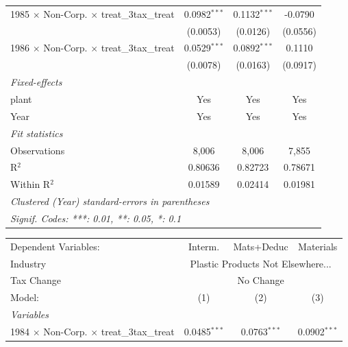 \documentclass[
  12pt]{article}
\theoremstyle{definition}
\theoremstyle{remark}
\begin{document}
\begin{table}
\begin{minipage}{\linewidth}
\begin{tabular}{lccc}
   1985 $\times$ Non-Corp. $\times$ treat\_3tax\_treat     & 0.0982$^{***}$ & 0.1132$^{***}$ & -0.0790\\   
                                                           & (0.0053)       & (0.0126)       & (0.0556)\\   
   1986 $\times$ Non-Corp. $\times$ treat\_3tax\_treat     & 0.0529$^{***}$ & 0.0892$^{***}$ & 0.1110\\   
                                                           & (0.0078)       & (0.0163)       & (0.0917)\\   
   \midrule
   \emph{Fixed-effects}\\
   plant                                                   & Yes            & Yes            & Yes\\  
   Year                                                    & Yes            & Yes            & Yes\\  
   \midrule
   \emph{Fit statistics}\\
   Observations                                            & 8,006          & 8,006          & 7,855\\  
   R$^2$                                                   & 0.80636        & 0.82723        & 0.78671\\  
   Within R$^2$                                            & 0.01589        & 0.02414        & 0.01981\\  
   \midrule \midrule
   \multicolumn{4}{l}{\emph{Clustered (Year) standard-errors in parentheses}}\\
   \multicolumn{4}{l}{\emph{Signif. Codes: ***: 0.01, **: 0.05, *: 0.1}}\\
\end{tabular}
\par\endgroup
\begingroup
\centering
\begin{tabular}{lccc}
   \tabularnewline \midrule \midrule
   Dependent Variables:                                    & Interm.        & Mats+Deduc     & Materials\\  
   Industry & \multicolumn{3}{c}{Plastic Products Not Elsewhere...} \\ 
   Tax Change & \multicolumn{3}{c}{No Change} \\ 
   Model:                                                  & (1)            & (2)            & (3)\\  
   \midrule
   \emph{Variables}\\
   1984 $\times$ Non-Corp. $\times$ treat\_3tax\_treat     & 0.0485$^{***}$ & 0.0763$^{***}$ & 0.0902$^{***}$\\   

\end{tabular}
\end{minipage}
\end{table}
\end{document}
